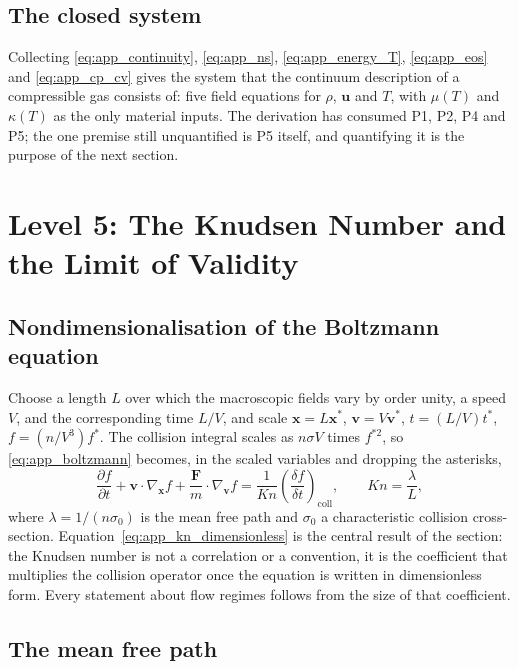 \subsection{The closed system}

Collecting \eqref{eq:app_continuity}, \eqref{eq:app_ns}, \eqref{eq:app_energy_T}, \eqref{eq:app_eos} and \eqref{eq:app_cp_cv} gives the system that the continuum description of a compressible gas consists of: five field equations for $\rho$, $\mathbf{u}$ and $T$, with $\mu(T)$ and $\kappa(T)$ as the only material inputs. The derivation has consumed P1, P2, P4 and P5; the one premise still unquantified is P5 itself, and quantifying it is the purpose of the next section.

\section{Level 5: The Knudsen Number and the Limit of Validity}
\label{app:kn}

\subsection{Nondimensionalisation of the Boltzmann equation}

Choose a length $L$ over which the macroscopic fields vary by order unity, a speed $V$, and the corresponding time $L/V$, and scale $\mathbf{x} = L\mathbf{x}^*$, $\mathbf{v} = V\mathbf{v}^*$, $t = (L/V)t^*$, $f = (n/V^3)f^*$. The collision integral scales as $n\sigma V$ times $f^{*2}$, so \eqref{eq:app_boltzmann} becomes, in the scaled variables and dropping the asterisks,
\begin{equation}
    \frac{\partial f}{\partial t} + \mathbf{v}\cdot\nabla_{\mathbf{x}}f + \frac{\mathbf{F}}{m}\cdot\nabla_{\mathbf{v}}f
    = \frac{1}{Kn}\left(\frac{\delta f}{\delta t}\right)_{\mathrm{coll}} ,
    \qquad
    Kn = \frac{\lambda}{L} ,
    \label{eq:app_kn_dimensionless}
\end{equation}
where $\lambda = 1/(n\sigma_0)$ is the mean free path and $\sigma_0$ a characteristic collision cross-section. Equation~\eqref{eq:app_kn_dimensionless} is the central result of the section: the Knudsen number is not a correlation or a convention, it is the coefficient that multiplies the collision operator once the equation is written in dimensionless form. Every statement about flow regimes follows from the size of that coefficient.

\subsection{The mean free path}

